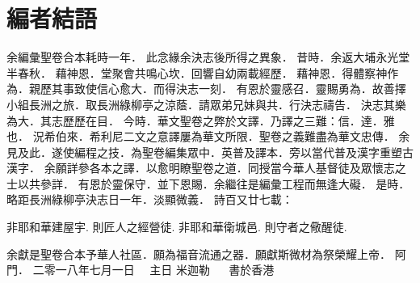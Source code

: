 \chapter*{編者結語}

余編彙聖卷合本耗時一年．
此念緣余決志後所得之異象．
\newline
\newline
昔時．余返大埔永光堂半春秋．
藉神恩．堂聚會共鳴心坎．回響自幼兩載經歷．
藉神恩．得體察神作為．親歷其事致使信心愈大．而得決志一刻．
有恩於靈感召．靈賜勇為．故善擇小組長洲之旅．取長洲綠柳亭之涼蔭．請眾弟兄妹與共．行決志禱告．
決志其樂為大．其志歷歷在目．
\newline
\newline
今時．華文聖卷之弊於文譯．乃譯之三難：信．達．雅也．
況希伯來．希利尼二文之意譯屢為華文所限．聖卷之義難盡為華文忠傳．
余見及此．遂使編程之技．為聖卷編集眾中．英普及譯本．旁以當代普及漢字重塑古漢字．
余願詳參各本之譯．以愈明瞭聖卷之道．同授當今華人基督徒及眾懷志之士以共參詳．
有恩於靈保守．並下恩賜．余繼往是編彙工程而無逢大礙．
\newline
\newline
是時．略距長洲綠柳亭決志日一年．淡顯微義．
\newline
\newline
詩百又廿七載：
\newline
\newline
\begin{center}
    非耶和華建屋宇. 則匠人之經營徒. 
\newline
    非耶和華衛城邑. 則守者之儆醒徒.
\newline
\newline
\end{center}
余獻是聖卷合本予華人社區．願為福音流通之器．願獻斯微材為祭榮耀上帝．
\newline
\newline
阿門．
\newline
\newline
二零一八年七月一日~~ 主日
\newline
\newline
米迦勒 ~~ 書於香港
